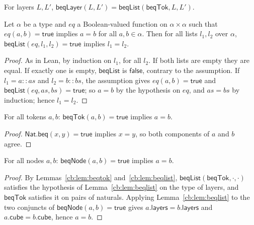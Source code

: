 \begin{definition}\label{cb:def:beqlayer}
For layers $L,L'$, $\mathsf{beqLayer}(L,L')=\mathsf{beqList}(\mathsf{beqTok},L,L')$.
\end{definition}

\begin{lemma}\label{cb:lem:beqlist}
Let $\alpha$ be a type and $eq$ a Boolean-valued function on $\alpha\times\alpha$ such that $eq(a,b)=\mathsf{true}$
implies $a=b$ for all $a,b\in\alpha$. Then for all lists $l_1,l_2$ over $\alpha$,
$\mathsf{beqList}(eq,l_1,l_2)=\mathsf{true}$ implies $l_1=l_2$.
\end{lemma}

\begin{proof}
As in Lean, by induction on $l_1$, for all $l_2$. If both lists are empty they are equal. If exactly one is empty,
$\mathsf{beqList}$ is $\mathsf{false}$, contrary to the assumption. If $l_1=a\mathbin{::}as$ and $l_2=b\mathbin{::}bs$,
the assumption gives $eq(a,b)=\mathsf{true}$ and $\mathsf{beqList}(eq,as,bs)=\mathsf{true}$; so $a=b$ by the hypothesis
on $eq$, and $as=bs$ by induction; hence $l_1=l_2$.
\end{proof}

\begin{lemma}\label{cb:lem:beqtok}
For all tokens $a,b$: $\mathsf{beqTok}(a,b)=\mathsf{true}$ implies $a=b$.
\end{lemma}

\begin{proof}
$\mathsf{Nat.beq}(x,y)=\mathsf{true}$ implies $x=y$, so both components of $a$ and $b$ agree.
\end{proof}

\begin{lemma}\label{cb:lem:beqnode}
For all nodes $a,b$: $\mathsf{beqNode}(a,b)=\mathsf{true}$ implies $a=b$.
\end{lemma}

\begin{proof}
By Lemmas~\ref{cb:lem:beqtok} and~\ref{cb:lem:beqlist}, $\mathsf{beqList}(\mathsf{beqTok},\cdot,\cdot)$ satisfies the
hypothesis of Lemma~\ref{cb:lem:beqlist} on the type of layers, and $\mathsf{beqTok}$ satisfies it on pairs of
naturals. Applying Lemma~\ref{cb:lem:beqlist} to the two conjuncts of $\mathsf{beqNode}(a,b)=\mathsf{true}$ gives
$a.\mathsf{layers}=b.\mathsf{layers}$ and $a.\mathsf{cube}=b.\mathsf{cube}$, hence $a=b$.
\end{proof}

